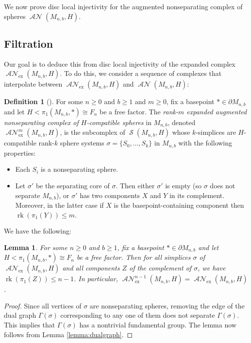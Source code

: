 \documentclass[11pt]{amsart}
\numberwithin{equation}{section}
\theoremstyle{plain}
\newtheorem{lemma}[theorem]{Lemma}
\theoremstyle{definition}
\newtheorem{defn}[theorem]{Definition}
\newenvironment{definition}[1][]{\begin{defn}[#1]\pushQED{\qed}}{\popQED \end{defn}}
\theoremstyle{remark}
\DeclareMathOperator{\rank}{rk}
\DeclareMathOperator{\Spheres}{\mathcal{S}}
\DeclareMathOperator{\ANSpheres}{\mathcal{AN}}
\newcommand\ANSpheresEX{\ANSpheres_{\text{ex}}}
\begin{document}
We now prove disc local injectivity for the augmented nonseparating complex of spheres $\ANSpheres(M_{n,b},H)$.

\subsection{Filtration}
Our goal is to deduce this from disc local injectivity of the expanded complex $\ANSpheresEX(M_{n,b},H)$.  
To do this, we consider a sequence of complexes that interpolate between $\ANSpheresEX(M_{n,b},H)$ and
$\ANSpheres(M_{n,b},H)$:

\begin{definition}
For some $n \geq 0$ and $b \geq 1$ and $m \geq 0$, fix a basepoint $\ast \in \partial M_{n,b}$
and let $H < \pi_1(M_{n,b},\ast) \cong F_n$ be a free factor.  The {\em rank-$m$ expanded augmented nonseparating complex of
$H$-compatible spheres} in $M_{n,b}$, denoted $\ANSpheresEX^m(M_{n,b},H)$, is
the subcomplex of $\Spheres(M_{n,b},H)$ whose $k$-simplices are $H$-compatible rank-$k$ sphere
systems $\sigma = \{S_0,\ldots,S_k\}$ in $M_{n,b}$ with the following properties:
\begin{itemize}
\item Each $S_i$ is a nonseparating sphere.
\item Let $\sigma'$ be the separating core of $\sigma$.  Then either $\sigma'$ is empty (so
$\sigma$ does not separate $M_{n,b}$), or $\sigma'$ has two components $X$ and $Y$ in
its complement.  Moreover, in the latter case if $X$ is the basepoint-containing component
then $\rank(\pi_1(Y)) \leq m$.\qedhere
\end{itemize}
\end{definition}

We have the following:

\begin{lemma}
\label{lemma:identifyan}
For some $n \geq 0$ and $b \geq 1$, fix a basepoint $\ast \in \partial M_{n,b}$
and let $H < \pi_1(M_{n,b},\ast) \cong F_n$ be a free factor.  Then for all
simplices $\sigma$ of $\ANSpheresEX(M_{n,b},H)$ and all components $Z$ of
the complement of $\sigma$, we have $\rank(\pi_1(Z)) \leq n-1$.  In particular,
$\ANSpheresEX^{n-1}(M_{n,b},H) = \ANSpheresEX(M_{n,b},H)$.
\end{lemma}
\begin{proof}
Since all vertices of $\sigma$ are nonseparating spheres, removing the edge of the dual
graph $\Gamma(\sigma)$ corresponding to any one of them does not separate $\Gamma(\sigma)$.
This implies that $\Gamma(\sigma)$ has a nontrivial fundamental group.  The
lemma now follows from Lemma \ref{lemma:dualgraph}.
\end{proof}
\end{document}

